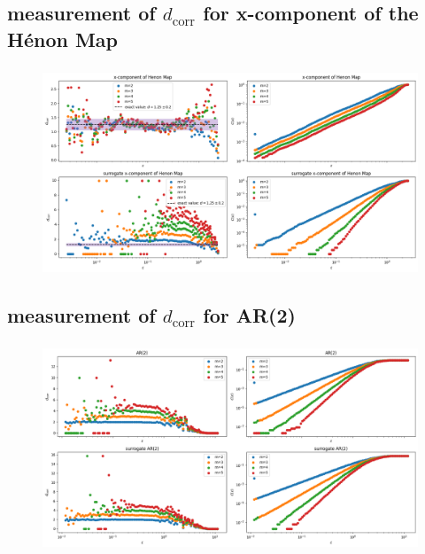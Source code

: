 \subsection{measurement of $d_\mathrm{corr}$ for x-component of the Hénon Map}
\begin{frame}
  \frametitle{\insertsectionhead}
  \framesubtitle{\insertsubsectionhead}
  \begin{figure}
    \centering
    \includegraphics[height=0.8\textheight]{figs/d_henon.png}
  \end{figure}
\end{frame}

\subsection{measurement of $d_\mathrm{corr}$ for AR(2)}
\begin{frame}
  \frametitle{\insertsectionhead}
  \framesubtitle{\insertsubsectionhead}
  \begin{figure}
    \centering
    \includegraphics[height=0.8\textheight]{figs/d_ar2.png}
  \end{figure}
\end{frame}

